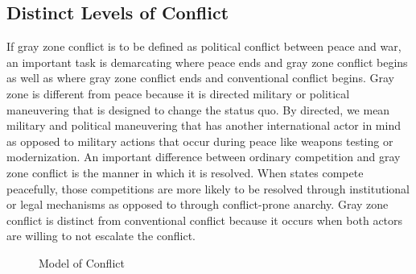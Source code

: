 \documentclass[12pt,letterpaper]{article}
\begin{document}
	\subsection{Distinct Levels of Conflict}
		If gray zone conflict is to be defined as political conflict between peace and war, an important task is demarcating where peace ends and gray zone conflict begins as well as where gray zone conflict ends and conventional conflict begins. Gray zone is different from peace because it is directed military or political maneuvering that is designed to change the status quo. By directed, we mean military and political maneuvering that has another international actor in mind as opposed to military actions that occur during peace like weapons testing or modernization. An important difference between ordinary competition and gray zone conflict is the manner in which it is resolved. When states compete peacefully, those competitions are more likely to be resolved through institutional or legal mechanisms as opposed to through conflict-prone anarchy. Gray zone conflict is distinct from conventional conflict because it occurs when both actors are willing to not escalate the conflict.
				
		\begin{figure}[H]
			\centering
			\label{fig_scale}
			\caption{Model of Conflict}
		\end{figure}
				
\end{document}
